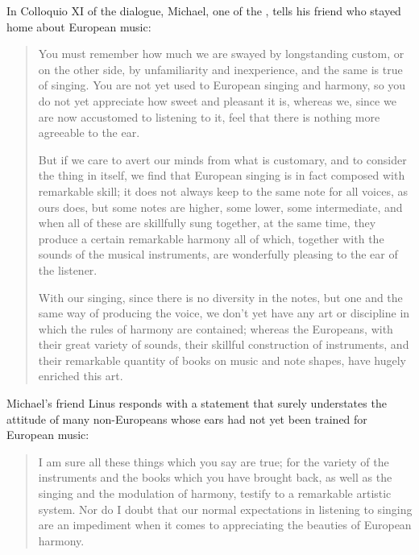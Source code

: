 In Colloquio XI of the dialogue, Michael, one of the , 
tells his friend who stayed home about European music:
\begin{quotation}
    You must remember \Dots{} how much we are swayed by longstanding custom, or 
    on the other side, by unfamiliarity and inexperience, and the same is true of 
    singing. 
    You are not yet used to European singing and harmony, so you do not yet 
    appreciate how sweet and pleasant it is, whereas we, since we are now 
    accustomed to listening to it, feel that there is nothing more agreeable to the 
    ear.

    But if we care to avert our minds from what is customary, and to consider 
    the thing in itself, we find that European singing is in fact composed with 
    remarkable skill; it does not always keep to the same note for all voices, as 
    ours does, but some notes are higher, some lower, some intermediate, and when 
    all of these are skillfully sung together, at the same time, they produce a 
    certain remarkable harmony \Dots{} all of which, \Dots{} together with the 
    sounds of the musical instruments, are wonderfully pleasing to the ear of the 
    listener. \Dots{}

    With our singing, since there is no diversity in the notes, but one and the 
    same way of producing the voice, we don't yet have any art or discipline in 
    which the rules of harmony are contained; whereas the Europeans, with their 
    great variety of sounds, their skillful construction of instruments, and their 
    remarkable quantity of books on music and note shapes, have hugely enriched 
    this art.%
         \Autocite[155-156]{Massarella:JapaneseTravellers}
\end{quotation}
Michael's friend Linus responds with a statement that surely understates the 
attitude of many non-Europeans whose ears had not yet been trained for European 
music:
\begin{quote}
    I am sure all these things which you say are true; for the variety of the 
    instruments and the books which you have brought back, as well as the singing 
    and the modulation of harmony, testify to a remarkable artistic system.
    Nor do I doubt that our normal expectations in listening to singing are an 
    impediment when it comes to appreciating the beauties of European harmony.%
         \Autocite[156]{Massarella:JapaneseTravellers}
\end{quote}


